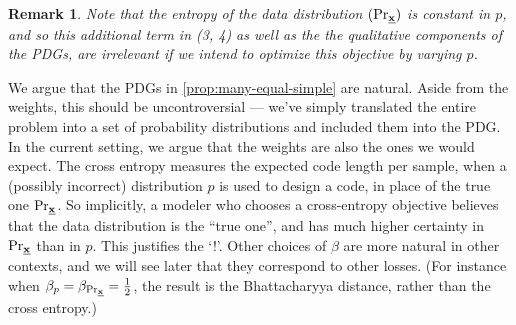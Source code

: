 \documentclass{article}
\theoremstyle{plain}
\newtheorem{remark}{Remark}
\theoremstyle{definition}
\let\H\relax
\DeclareMathOperator{\H}{\mathrm{H}} %
\newcommand{\datadist}[1]{\Pr\nolimits_{#1}}
\begin{document}
\begin{remark}
Note that the entropy of the data distribution $\H(\datadist\xsamp)$ is constant in $p$, and so this additional term in (3, 4) as well as the the qualitative components of the PDGs, are irrelevant if we intend to optimize this objective by varying $p$.
\end{remark}

We argue that the PDGs in \cref{prop:many-equal-simple} are natural. Aside from the weights, this should be uncontroversial --- we've simply translated the entire problem into a set of probability distributions and included them into the PDG.
In the current setting, we argue that the weights are also the ones we would expect. The cross entropy measures the expected code length per sample, when a (possibly incorrect) distribution $p$ is used to design a code, in place of the true one $\datadist\xsamp$.
So implicitly, a modeler who chooses a cross-entropy objective believes that the data distribution is the ``true one'', and has much higher certainty in $\datadist\xsamp$ than in $p$. This justifies the `!'.
Other choices of $\beta$ are more natural in other contexts, and we will see later that they correspond to other losses. (For instance when $\beta_p = \beta_{\datadist\xsamp} = \frac12$, the result is the Bhattacharyya distance, rather than the cross entropy.)

\end{document}
